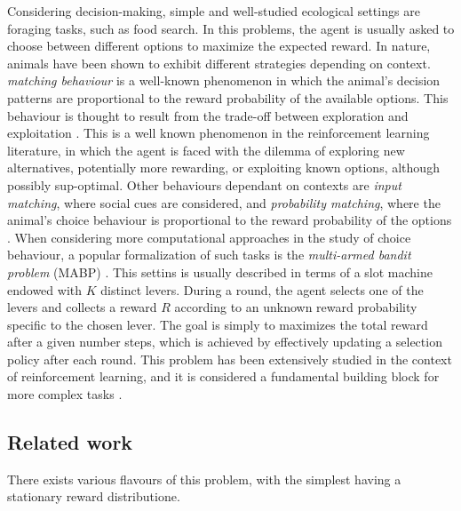 Considering decision-making, simple and well-studied ecological settings are foraging tasks, such as food search. In this problems, the agent is usually asked to choose between different options to maximize the expected reward.
In nature, animals have been shown to exhibit different strategies depending on context.
\textit{matching behaviour} is a well-known phenomenon in which the animal's decision patterns are proportional to the reward probability of the available options.
This behaviour is thought to result from the trade-off between exploration and exploitation \cite{suttonReinforcementLearningProblem1998, nivEvolutionReinforcementLearning2002}.
This is a well known phenomenon in the reinforcement learning literature, in which the agent is faced with the dilemma of exploring new alternatives, potentially more rewarding, or exploiting known options, although possibly sup-optimal.
Other behaviours dependant on contexts are \textit{input matching}, where social cues are considered, and \textit{probability matching}, where the animal's choice behaviour is proportional to the reward probability of the options \cite{bariDynamicDecisionMaking2021, houstonMatchingBehavioursRewards2021}.
When considering more computational approaches in the study of choice behaviour, a popular formalization of such tasks is the \textit{multi-armed bandit problem} (MABP) \cite{averbeckTheoryChoiceBandit2015}. This settins is usually described in terms of a slot machine endowed with $K$ distinct levers.
During a round, the agent selects one of the levers and collects a reward $R$ according to an unknown reward probability specific to the chosen lever.
The goal is simply to maximizes the total reward after a given number steps, which is achieved by effectively updating a selection policy after each round.
This problem has been extensively studied in the context of reinforcement learning, and it is considered a fundamental building block for more complex tasks \cite{suttonReinforcementLearningProblem1998}.

\subsection{Related work}
There exists various flavours of this problem, with the simplest having a stationary reward distributione.

